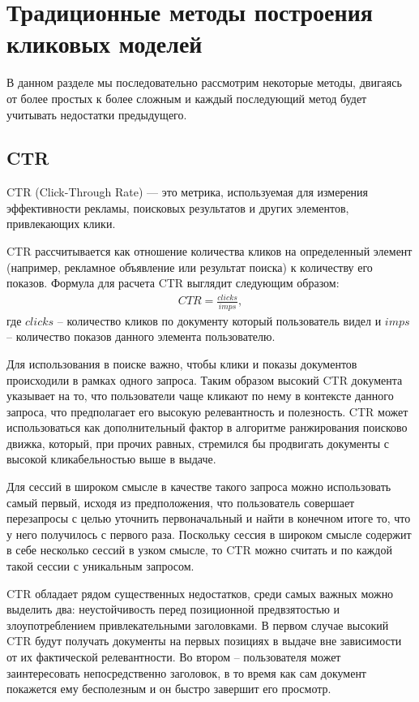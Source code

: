 \documentclass[diploma]{nanolab2015}
\begin{document}
\section{Традиционные методы построения кликовых моделей}
В данном разделе мы последовательно рассмотрим некоторые методы, двигаясь от более простых к более сложным и каждый последующий метод будет учитывать недостатки предыдущего.
\subsection{CTR}
CTR (Click-Through Rate) — это метрика, используемая для измерения эффективности рекламы, поисковых результатов и других элементов, привлекающих клики. %

CTR рассчитывается как отношение количества кликов на определенный элемент (например, рекламное объявление или результат поиска) к количеству его показов. Формула для расчета CTR выглядит следующим образом:
\begin{align}
    CTR = \frac{clicks}{imps},
\end{align}
где $clicks$ -- количество кликов по документу который пользователь видел и $imps$ -- количество показов данного элемента пользователю.

Для использования в поиске важно, чтобы клики и показы документов происходили в рамках одного запроса. Таким образом высокий CTR документа указывает на то, что пользователи чаще кликают по нему в контексте данного запроса, что предполагает его высокую релевантность и полезность. CTR может использоваться как дополнительный фактор в алгоритме ранжирования поисково движка, который, при прочих равных, стремился бы продвигать документы с высокой кликабельностью выше в выдаче.

Для сессий в широком смысле в качестве такого запроса можно использовать самый первый, исходя из предположения, что пользователь совершает перезапросы с целью уточнить первоначальный и найти в конечном итоге то, что у него получилось с первого раза. Поскольку сессия в широком смысле содержит в себе несколько сессий в узком смысле, то CTR можно считать и по каждой такой сессии с уникальным запросом.

CTR обладает рядом существенных недостатков, среди самых важных можно выделить два: неустойчивость перед позиционной предвзятостью и злоупотреблением привлекательными заголовками. В первом случае высокий CTR будут получать документы на первых позициях в выдаче вне зависимости от их фактической релевантности. Во втором -- пользователя может заинтересовать непосредственно заголовок, в то время как сам документ покажется ему бесполезным и он быстро завершит его просмотр.
\end{document}
